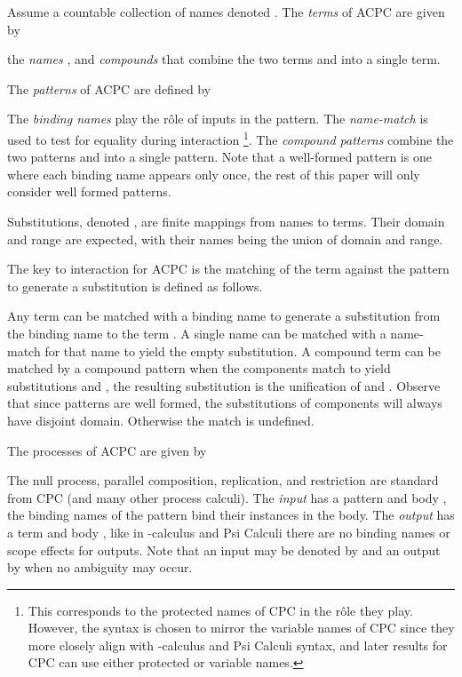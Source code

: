 \documentclass[submission,copyright,creativecommons]{eptcs}
\begin{document}
Assume a countable collection of names denoted .
The {\em terms} of ACPC are given by

the {\em names} , and {\em compounds}  that combine the two terms  and 
into a single term.

The {\em patterns} of ACPC are defined by

The {\em binding names}  play the r\^ole of inputs in the pattern.
The {\em name-match}  is used to test for equality during interaction
\footnote{This corresponds to the protected names  of CPC in the
r\^ole they play. However, the syntax is chosen to mirror the variable names
 of CPC since they more closely align with -calculus and Psi Calculi syntax, and
later results for CPC can use either protected or variable names.}.
The {\em compound patterns}  combine the two patterns  and  into a single pattern.
Note that a well-formed pattern is one where each binding name appears only once, the
rest of this paper will only consider well formed patterns.

Substitutions, denoted , are finite mappings from names to terms.
Their domain and range are expected, with their names being the union of domain and range.

\renewcommand{\match}[2]{\{#1/\!\!/#2\}}

The key to interaction for ACPC is the matching  of the term  against the pattern 
to generate a substitution 
is defined as follows.

Any term  can be matched with a binding name  to generate a substitution from the
binding name to the term .
A single name  can be matched with a name-match for that name  to yield the
empty substitution.
A compound term  can be matched by a compound pattern  when
the components match to yield substitutions  and ,
the resulting substitution is the unification of  and .
Observe that since patterns are well formed, the substitutions of components will always have
disjoint domain.
Otherwise the match is undefined.

The processes of ACPC are given by

The null process, parallel composition, replication, and restriction are standard
from CPC (and many other process calculi).
The {\em input}  has a pattern  and body , the binding names of the pattern
bind their instances in the body.
The {\em output}  has a term  and body , like in -calculus and Psi
Calculi there are no binding names or scope effects for outputs.
Note that an input  may be denoted by  and an output 
by  when no ambiguity may occur.
\end{document}
